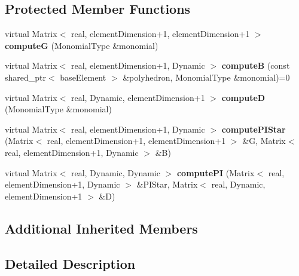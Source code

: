 \subsection*{Protected Member Functions}
\begin{DoxyCompactItemize}
\item 
virtual Matrix$<$ real, element\+Dimension+1, element\+Dimension+1 $>$ {\bfseries computeG} (Monomial\+Type \&monomial)\hypertarget{class_solver_v_e_m_a65980d6c3c850f5e8d037a9761438e93}{}\label{class_solver_v_e_m_a65980d6c3c850f5e8d037a9761438e93}

\item 
virtual Matrix$<$ real, element\+Dimension+1, Dynamic $>$ {\bfseries computeB} (const shared\+\_\+ptr$<$ base\+Element $>$ \&polyhedron, Monomial\+Type \&monomial)=0\hypertarget{class_solver_v_e_m_a512de296031ac2f954f95c2e78da063d}{}\label{class_solver_v_e_m_a512de296031ac2f954f95c2e78da063d}

\item 
virtual Matrix$<$ real, Dynamic, element\+Dimension+1 $>$ {\bfseries computeD} (Monomial\+Type \&monomial)\hypertarget{class_solver_v_e_m_a73bb74a85b8b436e8e24ed874c8c2ef9}{}\label{class_solver_v_e_m_a73bb74a85b8b436e8e24ed874c8c2ef9}

\item 
virtual Matrix$<$ real, element\+Dimension+1, Dynamic $>$ {\bfseries compute\+P\+I\+Star} (Matrix$<$ real, element\+Dimension+1, element\+Dimension+1 $>$ \&G, Matrix$<$ real, element\+Dimension+1, Dynamic $>$ \&B)\hypertarget{class_solver_v_e_m_a9f092078e8698d00c862e53cae1e20e1}{}\label{class_solver_v_e_m_a9f092078e8698d00c862e53cae1e20e1}

\item 
virtual Matrix$<$ real, Dynamic, Dynamic $>$ {\bfseries compute\+PI} (Matrix$<$ real, element\+Dimension+1, Dynamic $>$ \&P\+I\+Star, Matrix$<$ real, Dynamic, element\+Dimension+1 $>$ \&D)\hypertarget{class_solver_v_e_m_a8d296a88bc9f863fe72688cad49ef2a3}{}\label{class_solver_v_e_m_a8d296a88bc9f863fe72688cad49ef2a3}

\end{DoxyCompactItemize}
\subsection*{Additional Inherited Members}


\subsection{Detailed Description}
